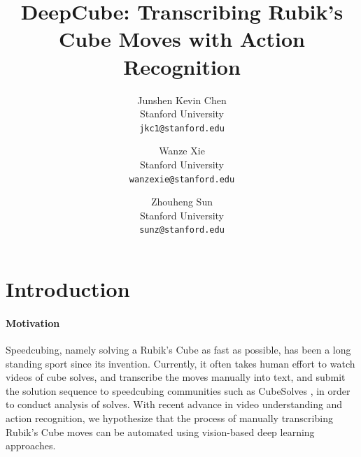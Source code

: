 \documentclass[10pt,twocolumn,letterpaper]{article}
\begin{document}
\title{
    DeepCube: Transcribing Rubik's Cube Moves with Action Recognition
}

\author{Junshen Kevin Chen\\
Stanford University\\
{\tt\small jkc1@stanford.edu}
\and
Wanze Xie\\
Stanford University\\
{\tt\small wanzexie@stanford.edu}
\and
Zhouheng Sun\\
Stanford University\\
{\tt\small sunz@stanford.edu}
}

\maketitle


\section{Introduction}



\paragraph{Motivation}
Speedcubing, namely solving a Rubik's Cube as fast as possible, has been a long standing sport since its invention. Currently, it often takes human effort to watch videos of cube solves, and transcribe the moves manually into text, and submit the solution sequence to speedcubing communities such as CubeSolves \cite{CubeSolves}, in order to conduct analysis of solves. With recent advance in video understanding and action recognition, we hypothesize that the process of manually transcribing Rubik's Cube moves can be automated using vision-based deep learning approaches. 
\end{document}
